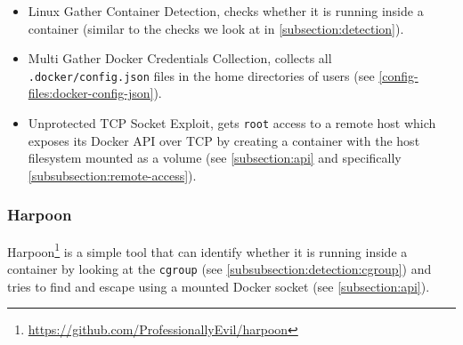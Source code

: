 \begin{itemize}
    \item Linux Gather Container Detection\cite{Metasploit-Linux-Gather-Container-Detection}, checks whether it is running inside a container (similar to the checks we look at in \autoref{subsection:detection}).
    \item Multi Gather Docker Credentials Collection\cite{Docker-Credentials-Metasploit}, collects all \lstinline{.docker/config.json} files in the home directories of users (see \autoref{config-files:docker-config-json}).
    \item Unprotected TCP Socket Exploit\cite{Metasploit-Unprotected-TCP-Socket}, gets \lstinline{root} access to a remote host which exposes its Docker API over TCP by creating a container with the host filesystem mounted as a volume (see \autoref{subsection:api} and specifically \autoref{subsubsection:remote-access}).
\end{itemize}

\subsubsection{Harpoon}
Harpoon\footnote{\url{https://github.com/ProfessionallyEvil/harpoon}} is a simple tool that can identify whether it is running inside a container by looking at the \lstinline{cgroup} (see \autoref{subsubsection:detection:cgroup}) and tries to find and escape using a mounted Docker socket (see \autoref{subsection:api}).
